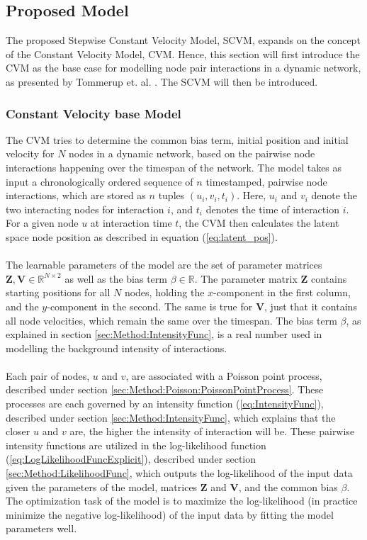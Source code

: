\subsection{Proposed Model}
\label{sec:Method:ProposedModel}
The proposed Stepwise Constant Velocity Model, SCVM, expands on the concept of the Constant Velocity Model, CVM. 
Hence, this section will first introduce the CVM as the base case for modelling node pair interactions in a dynamic network, as presented by Tommerup et. al. \cite{Tommerup2021LearningNetworks}. 
The SCVM will then be introduced. 


\subsubsection{Constant Velocity base Model}
\label{sec:Method:ProposedModel:ConstantVelocityModel}
The CVM tries to determine the common bias term, initial position and initial velocity for $N$ nodes in a dynamic network, based on the pairwise node interactions happening over the timespan of the network.
The model takes as input a chronologically ordered sequence of $n$ timestamped, pairwise node interactions, which are stored as $n$ tuples $(u_i, v_i, t_i)$.
Here, $u_i$ and $v_i$ denote the two interacting nodes for interaction $i$, and $t_i$ denotes the time of interaction $i$. For a given node $u$ at interaction time $t$, the CVM then calculates the latent space node position as described in equation (\ref{eq:latent_pos}).
\\\\
The learnable parameters of the model are the set of parameter matrices $\textbf{Z}, \textbf{V} \in \mathbb{R} ^{N \times 2}$ as well as the bias term $\beta \in \mathbb{R}$.
The parameter matrix $\textbf{Z}$ contains starting positions for all $N$ nodes, holding the $x$-component in the first column, and the $y$-component in the second.
The same is true for $\textbf{V}$, just that it contains all node velocities, which remain the same over the timespan.
The bias term $\beta$, as explained in section \ref{sec:Method:IntensityFunc}, is a real number used in modelling the background intensity of interactions.
\\\\
Each pair of nodes, $u$ and $v$, are associated with a Poisson point process, described under section \ref{sec:Method:Poisson:PoissonPointProcess}.
These processes are each governed by an intensity function (\ref{eq:IntensityFunc}), described under section \ref{sec:Method:IntensityFunc}, which explains that the closer $u$ and $v$ are, the higher the intensity of interaction will be. 
These pairwise intensity functions are utilized in the log-likelihood function (\ref{eq:LogLikelihoodFuncExplicit}), described under section \ref{sec:Method:LikelihoodFunc}, which outputs the log-likelihood of the input data given the parameters of the model, matrices $\textbf{Z}$ and $\textbf{V}$, and the common bias $\beta$.
\\
The optimization task of the model is to maximize the log-likelihood (in practice minimize the negative log-likelihood) of the input data by fitting the model parameters well.

